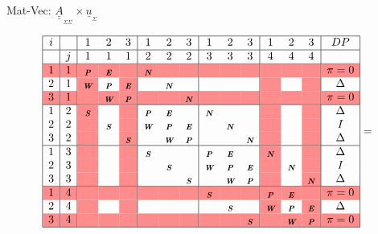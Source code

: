 \documentclass[handout]{beamer}
\newcommand{\red}{\cellcolor{red!45}}  %
\newcommand{\Matriz}[1]{\underline{\underline{#1}}}
\newcommand{\Vector}[1]{\underline{#1}}
\newcommand{\SubScript}[1]{_{_{#1}}}
\newcommand{\mbiu}[1]{_{\textbf{\em #1}}}
\begin{document}
\begin{frame}{Mat-Vec: $\Matriz{A}\SubScript{\Sigma \Sigma} \times \Vector{u}\SubScript{\Sigma}$}
\begin{tiny}
\begin{equation*}
\begin{array}{|c|c|ccc|ccc|ccc|ccc|c|}
\hline
i  &   & 1 & 2 & 3 & 1 & 2 & 3 & 1 & 2 & 3 & 1 & 2 & 3 & DP\\
\hline
   & j & 1 & 1 & 1 & 2 & 2 & 2 & 3 & 3 & 3 & 4 & 4 & 4 &  \\
\hline
\red 1 & \red 1 & \red \mbiu{P} & \red \mbiu{E} & \red & \red \mbiu{N} & \red & \red & \red & \red & \red & \red & \red & \red & \red \pi = 0 \\
2 & 1 & \red \mbiu{W} & \mbiu{P} & \red \mbiu{E} &          & \mbiu{N} &          &  &  &  & \red &  & \red & \Delta \\
\red 3 & \red 1 & \red & \red \mbiu{W} & \red \mbiu{P} & \red & \red & \red \mbiu{N} & \red & \red & \red & \red & \red & \red & \red \pi = 0 \\
\hline
1 & 2 & \red \mbiu{S} &          & \red & \mbiu{P} & \mbiu{E} &          & \mbiu{N} &      &     & \red  &   & \red & \Delta \\
2 & 2 & \red & \mbiu{S} & \red & \mbiu{W} & \mbiu{P} & \mbiu{E} &          & \mbiu{N} &          & \red  &   & \red & I \\
3 & 2 & \red &          & \red \mbiu{S} &          & \mbiu{W} & \mbiu{P} &          &     & \mbiu{N} & \red &   & \red & \Delta \\
\hline
1 & 3 & \red &   & \red & \mbiu{S} &          &          & \mbiu{P} & \mbiu{E} &          & \red \mbiu{N} &  & \red & \Delta  \\
2 & 3 & \red &   & \red &          & \mbiu{S} &          & \mbiu{W} & \mbiu{P} & \mbiu{E} & \red & \mbiu{N} & \red & I  \\
3 & 3 & \red &   & \red &          &          & \mbiu{S} &          & \mbiu{W} & \mbiu{P} & \red &          & \red \mbiu{N} & \Delta\\
\hline
\red 1 & \red 4 & \red & \red & \red & \red & \red & \red & \red \mbiu{S} & \red & \red & \red \mbiu{P} & \red \mbiu{E} & \red & \red  \pi = 0    \\
2 & 4 & \red &   & \red &   &   &   &          & \mbiu{S} &          & \red \mbiu{W} & \mbiu{P} & \red \mbiu{E} & \Delta \\
\red 3 & \red 4 & \red & \red & \red & \red & \red & \red & \red & \red & \red \mbiu{S} & \red & \red \mbiu{W} & \red \mbiu{P} & \red  
\pi = 0 \\
\hline
\end{array} =
\begin{array}{c}

\end{array}
\end{equation*}
\end{tiny}
\end{frame}
\end{document}

